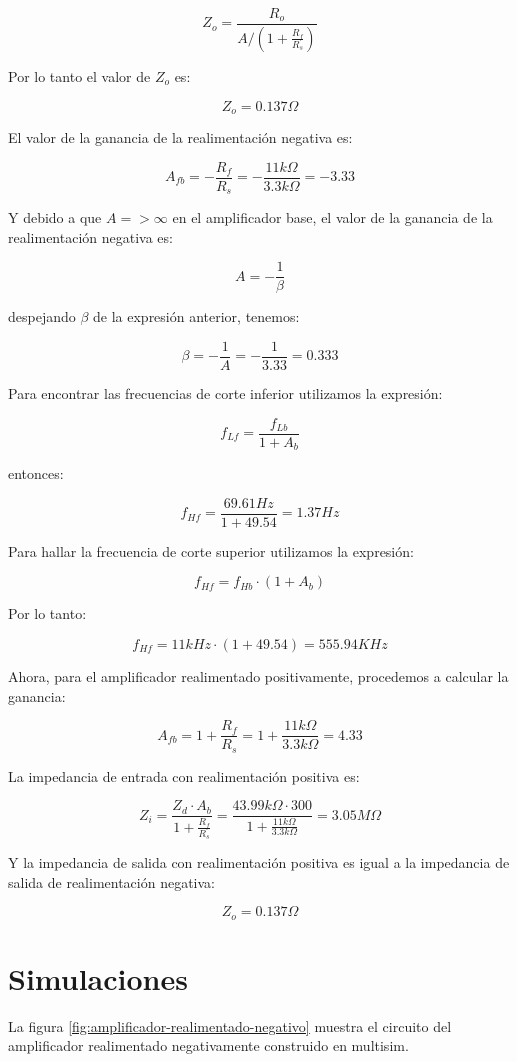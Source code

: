$$Z_o = \frac{R_o}{A / (1 + \frac{R_f}{R_s})}$$

Por lo tanto el valor de $Z_o$ es:

$$Z_o = 0.137 \Omega$$

El valor de la ganancia de la realimentación negativa es: 

$$A_{fb} = - \frac{R_f}{R_s} = - \frac{11k\Omega}{3.3k\Omega} = -3.33$$

Y debido a que $A => \infty$ en el amplificador base, el valor de la ganancia de la realimentación negativa es:

$$A = -\frac{1}{\beta}$$

despejando $\beta$ de la expresión anterior, tenemos:

$$\beta = -\frac{1}{A} = -\frac{1}{3.33} = 0.333$$

Para encontrar las frecuencias de corte inferior utilizamos la expresión:

$$f_{Lf} = \frac{f_{Lb}}{1 + A_{b}}$$

entonces:

$$f_{Hf} = \frac{69.61 Hz}{1 + 49.54} = 1.37 Hz$$

Para hallar la frecuencia de corte superior utilizamos la expresión:

$$f_{Hf} = f_{Hb}\cdot (1 + A_{b})$$

Por lo tanto:

$$f_{Hf} = 11kHz\cdot (1 + 49.54) = 555.94KHz$$

Ahora, para el amplificador realimentado positivamente, procedemos a calcular la ganancia:

$$A_{fb} = 1 + \frac{R_f}{R_s} = 1 + \frac{11k\Omega}{3.3k\Omega} = 4.33$$

La impedancia de entrada con realimentación positiva es:

$$ Z_i = \frac{Z_d \cdot A_b}{1 + \frac{R_f}{R_s}} = \frac{43.99k\Omega \cdot 300}{1 + \frac{11k\Omega}{3.3k\Omega}} = 3.05M\Omega$$

Y la impedancia de salida con realimentación positiva es igual a la impedancia de salida de realimentación negativa:

$$Z_o = 0.137 \Omega$$

\section{Simulaciones}

La figura \ref{fig:amplificador-realimentado-negativo} muestra el circuito del amplificador realimentado negativamente construido en multisim.

